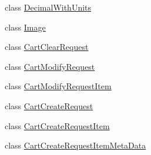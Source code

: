 \begin{DoxyCompactItemize}
\begin{DoxyCompactList}\small\item\em \end{DoxyCompactList}\item 
class \hyperlink{class_amazon___price___finder_1_1amazon_1_1ecs_1_1_decimal_with_units}{Decimal\-With\-Units}
\begin{DoxyCompactList}\small\item\em \end{DoxyCompactList}\item 
class \hyperlink{class_amazon___price___finder_1_1amazon_1_1ecs_1_1_image}{Image}
\begin{DoxyCompactList}\small\item\em \end{DoxyCompactList}\item 
class \hyperlink{class_amazon___price___finder_1_1amazon_1_1ecs_1_1_cart_clear_request}{Cart\-Clear\-Request}
\begin{DoxyCompactList}\small\item\em \end{DoxyCompactList}\item 
class \hyperlink{class_amazon___price___finder_1_1amazon_1_1ecs_1_1_cart_modify_request}{Cart\-Modify\-Request}
\begin{DoxyCompactList}\small\item\em \end{DoxyCompactList}\item 
class \hyperlink{class_amazon___price___finder_1_1amazon_1_1ecs_1_1_cart_modify_request_item}{Cart\-Modify\-Request\-Item}
\begin{DoxyCompactList}\small\item\em \end{DoxyCompactList}\item 
class \hyperlink{class_amazon___price___finder_1_1amazon_1_1ecs_1_1_cart_create_request}{Cart\-Create\-Request}
\begin{DoxyCompactList}\small\item\em \end{DoxyCompactList}\item 
class \hyperlink{class_amazon___price___finder_1_1amazon_1_1ecs_1_1_cart_create_request_item}{Cart\-Create\-Request\-Item}
\begin{DoxyCompactList}\small\item\em \end{DoxyCompactList}\item 
class \hyperlink{class_amazon___price___finder_1_1amazon_1_1ecs_1_1_cart_create_request_item_meta_data}{Cart\-Create\-Request\-Item\-Meta\-Data}

\end{DoxyCompactItemize}
